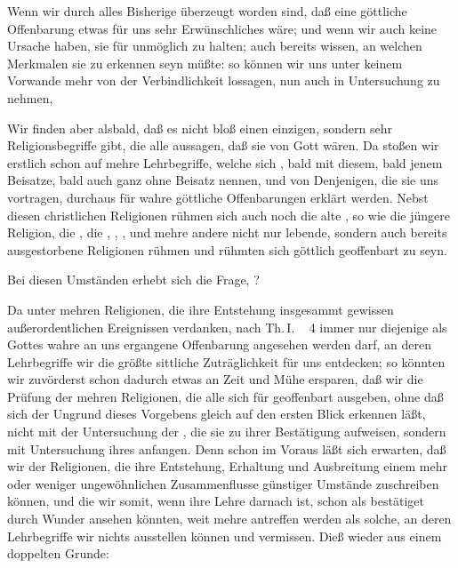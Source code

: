 \clearpage\linenumbers%

\begin{aufza}
\item Wenn wir durch alles Bisherige überzeugt worden sind, daß eine göttliche Offenbarung etwas für uns sehr Erwünschliches wäre; und wenn wir auch keine Ursache haben, sie für unmöglich zu halten; auch bereits wissen, an welchen Merkmalen sie zu erkennen seyn müßte: so können wir uns unter keinem Vorwande mehr von der Verbindlichkeit lossagen, nun auch in Untersuchung zu nehmen, 
\item Wir finden aber alsbald, daß es nicht bloß einen einzigen, sondern sehr  Religionsbegriffe gibt, die alle aussagen, daß sie von Gott  wären. Da stoßen wir erstlich schon auf mehre Lehrbegriffe, welche sich , bald mit diesem, bald jenem Beisatze, bald auch ganz ohne Beisatz nennen, und von Denjenigen, die sie uns vortragen, durchaus für wahre göttliche Offenbarungen erklärt werden. Nebst diesen christlichen Religionen rühmen sich auch noch die alte , so wie die jüngere  Religion, die , die , , ,  und mehre andere nicht nur lebende, sondern auch bereits ausgestorbene Religionen rühmen und rühmten sich göttlich geoffenbart zu seyn.
\item Bei diesen Umständen erhebt sich die Frage, ?~
\item Da unter mehren Religionen, die ihre Entstehung insgesammt gewissen außerordentlichen Ereignissen verdanken, nach Th.\,I.\ \ \no\,4 immer nur diejenige als Gottes wahre an uns ergangene Offenbarung angesehen werden darf, an deren Lehrbegriffe wir die größte sittliche Zuträglichkeit für uns entdecken; so könnten wir zuvörderst schon dadurch etwas an Zeit und Mühe ersparen, daß wir die Prüfung der mehren Religionen, die alle sich für geoffenbart ausgeben, ohne daß sich der Ungrund dieses Vorgebens gleich auf den ersten Blick erkennen läßt, nicht mit der Untersuchung der , die sie zu ihrer Bestätigung aufweisen, sondern mit Untersuchung ihres  anfangen. Denn schon im Voraus läßt sich erwarten, daß wir der Religionen, die ihre Entstehung, Erhaltung und Ausbreitung einem mehr oder weniger ungewöhnlichen Zusammenflusse günstiger Umstände zuschreiben können, und die wir somit, wenn ihre Lehre darnach ist, schon als bestätiget durch Wunder ansehen könnten, weit mehre antreffen werden als solche, an deren Lehrbegriffe wir nichts ausstellen können und vermissen. Dieß wieder aus einem doppelten Grunde:

\end{aufza}
